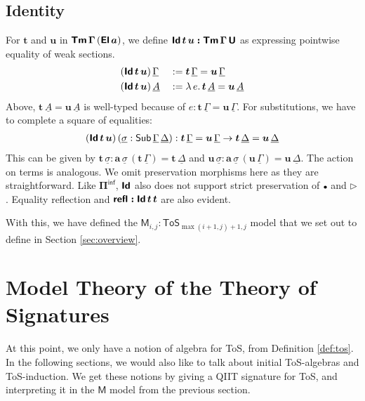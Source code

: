 \documentclass[sigplan,review,anonymous]{acmart}\settopmatter{printfolios=true,printccs=false,printacmref=false}
\newcommand{\ToS}{\mathsf{ToS}}
\newcommand{\ext}{\triangleright}
\newcommand{\emptycon}{\scaleobj{.75}\bullet}
\newcommand{\Piinf}{\Pi^{\mathsf{inf}}}
\newcommand{\bTm}{\boldsymbol{\Tm}}
\newcommand{\bGamma}{\boldsymbol{\Gamma}}
\newcommand{\bt}{\boldsymbol{t}}
\newcommand{\bu}{\boldsymbol{u}}
\newcommand{\ba}{\boldsymbol{a}}
\newcommand{\bU}{\boldsymbol{\U}}
\newcommand{\bEl}{\boldsymbol{\El}}
\newcommand{\bPiinf}{\boldsymbol{\Piinf}}
\newcommand{\bId}{\boldsymbol{\Id}}
\newcommand{\bM}{\boldsymbol{\mathsf{M}}}
\newcommand{\ul}[1]{\underline{#1}}
\newcommand{\ulGamma}{\ul{\Gamma}}
\newcommand{\ulDelta}{\ul{\Delta}}
\newcommand{\ulsigma}{\ul{\sigma}}
\newcommand{\ulA}{\ul{A}}
\begin{document}
\subsection{Identity}
For $\bt$ and $\bu$ in $\bTm\,\bGamma\,(\bEl\,\ba)$, we define $\bId\,\bt\,\bu
\boldsymbol{:} \bTm\,\bGamma\,\bU$ as expressing pointwise equality of weak
sections.
\begin{alignat*}{3}
& (\bId\,\bt\,\bu)\,\ulGamma &&:= \bt\,\ulGamma = \bu\,\ulGamma\\
& (\bId\,\bt\,\bu)\,\ulA     && := \lambda\,e.\, \bt\,\ulA = \bu\,\ulA
\end{alignat*}
Above, $\bt\,\ulA = \bu\,\ulA$ is well-typed because of $e :
\bt\,\ulGamma = \bu\,\ulGamma$. For substitutions, we have to complete a square
of equalities:
\begin{alignat*}{3}
  (\bId\,\bt\,\bu)\,(\ulsigma : \Sub\,\ulGamma\,\ulDelta) : \bt\,\ulGamma = \bu\,\ulGamma \ra
       \bt\,\ulDelta = \bu\,\ulDelta
\end{alignat*}
This can be given by $\bt\,\ulsigma : \ba\,\ulsigma\,(\bt\,\ulGamma) =
\bt\,\ulDelta$ and $\bu\,\ulsigma : \ba\,\ulsigma\,(\bu\,\ulGamma) =
\bu\,\ulDelta$. The action on terms is analogous. We omit preservation morphisms
here as they are straightforward. Like $\bPiinf$, $\bId$ also does not support
strict preservation of $\emptycon$ and $\ext$. Equality reflection and $\boldsymbol{\refl :}
\bId\,\bt\,\bt$ are also evident.

With this, we have defined the $\bM_{i,j} : \ToS_{\max(i+1,j)+1, j}$ model that
we set out to define in Section \ref{sec:overview}.

\section{Model Theory of the Theory of Signatures}
\label{sec:tossig}

At this point, we only have a notion of algebra for ToS, from Definition
\ref{def:tos}. In the following sections, we would also like to talk about
initial ToS-algebras and ToS-induction. We get these notions by giving a QIIT
signature for ToS, and interpreting it in the $\bM$ model from the previous
section.
\end{document}
